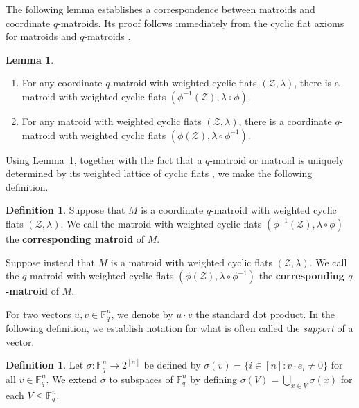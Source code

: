 \documentclass{article}
\theoremstyle{definition}
\newtheorem{definition}[theorem]{{{Definition}}}
\newtheorem{lemma}[theorem]{{{Lemma}}}
\begin{document}
The following lemma establishes a correspondence between matroids and coordinate $q$-matroids. Its proof follows immediately from the cyclic flat axioms for matroids \cite[Theorem 3.2]{BoninDeMier2008} and $q$-matroids \cite[Definition 4.1]{AlfaranoByrne2024CyclicFlats}.

\begin{lemma}\label{lem:corresponding_matroid}
\begin{enumerate}
    \item For any coordinate $q$-matroid with weighted cyclic flats $(\mathcal{Z},\lambda)$, there is a matroid with weighted cyclic flats $(\phi^{-1}(\mathcal{Z}),\lambda\circ\phi)$.
    
    \item For any matroid with weighted cyclic flats $(\mathcal{Z},\lambda)$, there is a coordinate $q$-matroid with weighted cyclic flats $(\phi(\mathcal{Z}),\lambda\circ\phi^{-1})$.
\end{enumerate}
\end{lemma}

Using Lemma~\ref{lem:corresponding_matroid}, together with the fact that a $q$-matroid or matroid is uniquely determined by its weighted lattice of cyclic flats \cite{AlfaranoByrne2024CyclicFlats,BoninDeMier2008}, we make the following definition.

\begin{definition}
    Suppose that $M$ is a coordinate $q$-matroid with weighted cyclic flats $(\mathcal{Z},\lambda)$. We call the matroid with weighted cyclic flats $(\phi^{-1}(\mathcal{Z}),\lambda\circ\phi)$ the \textbf{corresponding matroid} of $M$.
    
    Suppose instead that $M$ is a matroid with weighted cyclic flats $(\mathcal{Z},\lambda)$. We call the $q$-matroid with weighted cyclic flats $(\phi(\mathcal{Z}),\lambda\circ\phi^{-1})$ the \textbf{corresponding $q$-matroid} of $M$.
\end{definition}

For two vectors $u,v\in\mathbb{F}_q^n$, we denote by $u\cdot v$ the standard dot product. In the following definition, we establish notation for what is often called the \emph{support} of a vector.

\begin{definition}
    Let $\sigma:\mathbb{F}_q^n\to 2^{[n]}$ be defined by $\sigma(v)=\{i\in[n]:v\cdot e_i\neq 0\}$ for all $v\in\mathbb{F}_q^n$. We extend $\sigma$ to subspaces of $\mathbb{F}_q^n$ by defining $\sigma(V)=\bigcup_{x\in V}\sigma(x)$ for each $V\leq \mathbb{F}_q^n$.
\end{definition}
\end{document}

